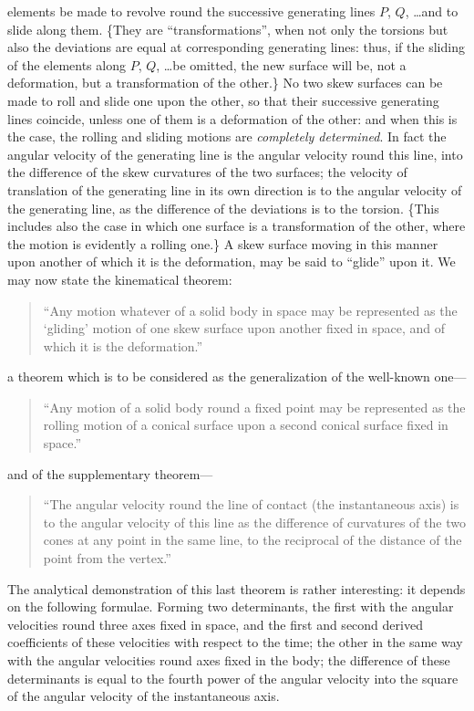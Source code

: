 \documentclass[11pt]{article}
\begin{document}
elements be made to revolve round the successive generating lines $P$, $Q$, \ldots and
to slide along them. \{They are ``transformations'', when not only the torsions but also
the deviations are equal at corresponding generating lines: thus, if the sliding of the
elements along $P$, $Q$, \ldots be omitted, the new surface will be, not a deformation,
but a transformation of the other.\} No two skew surfaces can be made to roll and slide
one upon the other, so that their successive generating lines coincide, unless one of
them is a deformation of the other: and when this is the case, the rolling and sliding
motions are \textit{completely determined}. In fact the angular velocity of the generating
line is the angular velocity round this line, into the difference of the skew curvatures
of the two surfaces; the velocity of translation of the generating line in its own
direction is to the angular velocity of the generating line, as the difference of the
deviations is to the torsion. \{This includes also the case in which one surface is a
transformation of the other, where the motion is evidently a rolling one.\} A skew
surface moving in this manner upon another of which it is the deformation, may be said
to ``glide'' upon it. We may now state the kinematical theorem:

\begin{quote}
``Any motion whatever of a solid body in space may be represented as the `gliding'
motion of one skew surface upon another fixed in space, and of which it is the
deformation.''
\end{quote}
a theorem which is to be considered as the generalization of the well-known one---
\begin{quote}
``Any motion of a solid body round a fixed point may be represented as the rolling
motion of a conical surface upon a second conical surface fixed in space.''
\end{quote}
and of the supplementary theorem---
\begin{quote}
``The angular velocity round the line of contact (the instantaneous axis) is to the
angular velocity of this line as the difference of curvatures of the two cones at any
point in the same line, to the reciprocal of the distance of the point from the vertex.''
\end{quote}

The analytical demonstration of this last theorem is rather interesting: it depends on
the following formulae. Forming two determinants, the first with the angular velocities
round three axes fixed in space, and the first and second derived coefficients of these
velocities with respect to the time; the other in the same way with the angular
velocities round axes fixed in the body; the difference of these determinants is equal
to the fourth power of the angular velocity into the square of the angular velocity of
the instantaneous axis.
\end{document}
